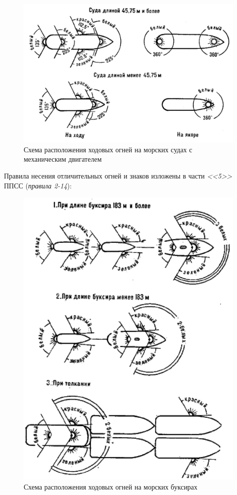 \documentclass[a4paper, 12pt, twoside, final]{scrbook}
\begin{document}
\begin{figure}[htbp]
   \centering
   \includegraphics{140_Ogni} %
   \caption{Схема расположения ходовых огней на морских судах с механическим двигателем}
   \label{fig:140}
\end{figure}

Правила несения отличительных огней и знаков изложены в части \textit{<<5>>} ППСС (\textit{правила 2-14}):

\begin{figure}[htbp]
   \centering
   \includegraphics{141_Ogni} %
   \caption{Схема расположения ходовых огней на морских буксирах}
   \label{fig:141}
\end{figure}
\end{document}
